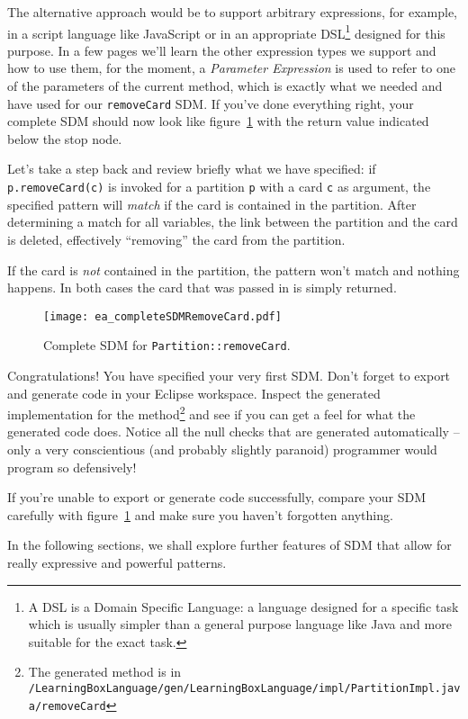 The alternative approach would be to support arbitrary expressions, for example, in a script language like JavaScript or in an appropriate DSL\footnote{A DSL is
a Domain Specific Language: a language designed for a specific task which is usually simpler than a general purpose language like Java and more suitable for the
exact task.} designed for this purpose. In a few pages we'll learn the other expression types  we support and how to use them, for
the moment, a \emph{Parameter Expression} is used to refer to one of the parameters of the current method, which is exactly what we needed and have used for our
\texttt{removeCard} SDM. If you've done everything right, your complete SDM should now look like figure~\ref{fig:sdm_complete_control_flow} with the return value
indicated below the stop node.

Let's take a step back and review briefly what we have specified:  if \texttt{p.remove\-Card(c)} is invoked for a partition \texttt{p} with a card \texttt{c} as
argument, the specified pattern will \emph{match} if the card is contained in the partition. After determining a match for all variables, the link between the
partition and the card is deleted, effectively ``removing'' the card from the partition.

If the card is \emph{not} contained in the partition, the pattern won't match and nothing happens. In both cases the card that was passed in is simply returned.

\begin{figure}[htbp]
\begin{center}
  \texttt{[image: ea\_completeSDMRemoveCard.pdf]}
  \caption{Complete SDM for \texttt{Partition::removeCard}.}  
  \label{fig:sdm_complete_control_flow}
\end{center}
\end{figure}

Congratulations!  You have specified your very first SDM.
Don't forget to export and generate code in your Eclipse workspace.
Inspect the generated implementation for the method\footnote{The generated method is in
\texttt{/Learning\-Box\-Language/\-gen/\-Learning\-Box\-Language/\-impl/\-Partition\-Impl.java/\-remove\-Card}} and see if you can get a feel for what the
generated code does.
Notice all the null checks that are generated automatically -- only a very conscientious (and probably slightly paranoid) programmer would program so
defensively!

If you're unable to export or generate code successfully, compare your SDM carefully with figure~\ref{fig:sdm_complete_control_flow} and make sure you haven't
forgotten anything.

In the following sections, we shall explore further features of SDM that allow for really expressive and powerful patterns.
